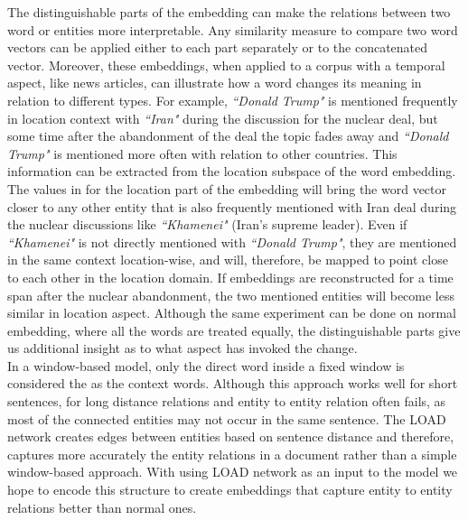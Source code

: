 \noindent 
The distinguishable parts of the embedding can make the relations between two word or entities more interpretable. Any similarity measure to compare two word vectors can be applied either to each part separately or to the concatenated vector. Moreover, these embeddings, when applied to a corpus with a temporal aspect, like news articles, can illustrate how a word changes its meaning in relation to different types. For example, \emph{``Donald Trump"} is mentioned frequently in location context with \emph{``Iran"} during the discussion for the nuclear deal, but some time after the abandonment of the deal the topic fades away and \emph{``Donald Trump"}  is mentioned more often with relation to other countries. This information can be extracted from the location subspace of the word embedding. The values in for the location part of the embedding will bring the word vector closer to any other entity that is also frequently mentioned with Iran deal during the nuclear discussions like \emph{``Khamenei"} (Iran's supreme leader). Even if \emph{``Khamenei"} is not directly mentioned with \emph{``Donald Trump"}, they are mentioned in the same context location-wise, and will, therefore, be mapped to point close to each other in the location domain. If embeddings are reconstructed for a time span after the nuclear abandonment, the two mentioned entities will become less similar in location aspect. Although the same experiment can be done on normal embedding, where all the words are treated equally, the distinguishable parts give us additional insight as to what aspect has invoked the change. \\
In a window-based model, only the direct word inside a fixed window is considered the as the context words. Although this approach works well for short sentences, for long distance relations and entity to entity relation often fails, as most of the connected entities may not occur in the same sentence. The LOAD network creates edges between entities based on sentence distance and therefore, captures more accurately the entity relations in a document rather than a simple window-based approach. With using LOAD network as an input to the model we hope to encode this structure to create embeddings that capture entity to entity relations better than normal ones. 
